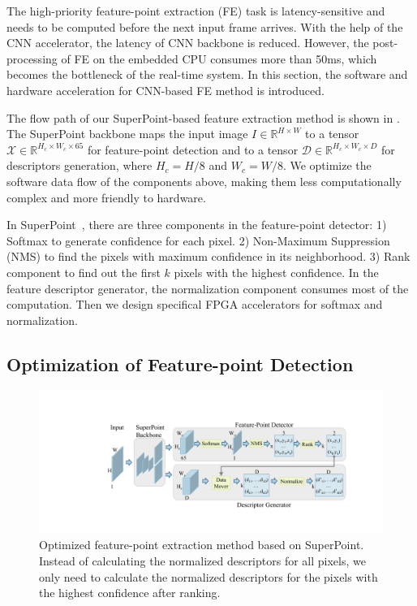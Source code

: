 \label{sec:hardsoftcodesign}
\label{subsec:FEopt}

The high-priority feature-point extraction (FE) task is latency-sensitive and needs to be computed before the next input frame arrives. With the help of the CNN accelerator, the latency of CNN backbone is reduced. However, the post-processing of FE on the embedded CPU consumes more than 50ms, which becomes the bottleneck of the real-time system. In this section, the software and hardware acceleration for CNN-based FE method is introduced.


The flow path of our SuperPoint-based feature extraction method is shown in . 
The SuperPoint backbone maps the input image $I\in \mathbb{R}^{H\times W}$ to a tensor $\mathcal{X}\in \mathbb{R}^{H_c\times W_c\times 65}$ for feature-point detection and to a tensor $\mathcal{D}\in \mathbb{R}^{H_c\times W_c\times D}$ for descriptors generation, where $H_c = H/8$ and $W_c = W/8$.
We optimize the software data flow of the components above, making them less computationally complex and more friendly to hardware. 

In SuperPoint~\cite{detone2018superpoint}, there are three components in the feature-point detector: 1) Softmax to generate confidence for each pixel. 2) Non-Maximum Suppression (NMS) to find the pixels with maximum confidence in its neighborhood. 3) Rank component to find out the first $k$ pixels with the highest confidence. 
In the feature descriptor generator, the normalization component consumes most of the computation. 
Then we design specifical FPGA accelerators for softmax and normalization.

\subsection{Optimization of Feature-point Detection}
\label{sec:softmaxopt}

\begin{figure}[t]
 \centering 
 \includegraphics[width=0.99\linewidth]{fig/superpoint.pdf}
 \vspace{-8mm}
 \caption{Optimized feature-point extraction method based on SuperPoint. Instead of calculating the normalized descriptors for all pixels, we only need to calculate the normalized descriptors for the pixels with the highest confidence after ranking.}
 \label{fig:superpoint}
\end{figure}

